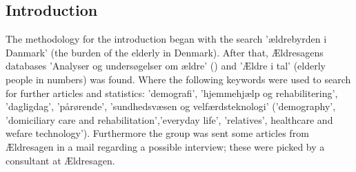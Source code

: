 \subsection{Introduction}

The  methodology for the introduction began with the search 'ældrebyrden i Danmark' (the burden of the elderly in Denmark). After that, Ældresagens databases 'Analyser og undersøgelser om ældre' () and 'Ældre i tal' (elderly people in numbers) was found. Where the following keywords were used to search for further articles and statistics: 'demografi', 'hjemmehjælp og rehabilitering', 'dagligdag', 'pårørende', 'sundhedsvæsen og velfærdsteknologi' ('demography', 'domiciliary care and rehabilitation','everyday life', 'relatives', healthcare and wefare technology'). Furthermore the group was sent some articles from Ældresagen in a mail regarding a possible interview; these were picked by a consultant at Ældresagen. 
